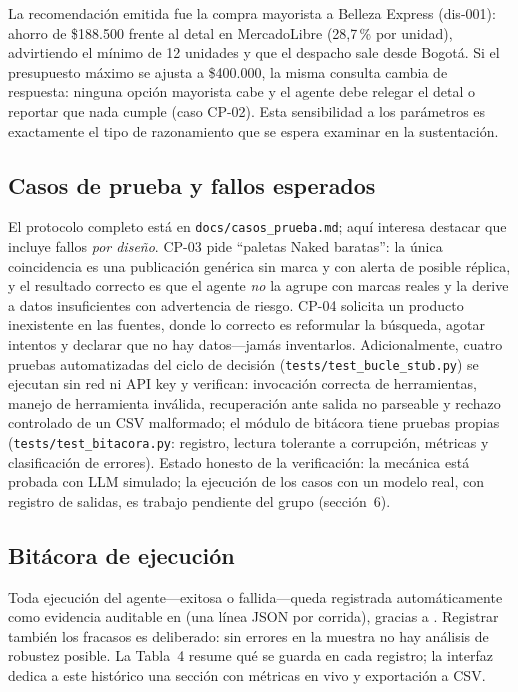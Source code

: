\documentclass[11pt,letterpaper]{article}
\begin{document}
La recomendación emitida fue la compra mayorista a Belleza Express (dis-001): ahorro de \$188.500
frente al detal en MercadoLibre (28,7\,\% por unidad), advirtiendo el mínimo de 12 unidades y que el
despacho sale desde Bogotá. Si el presupuesto máximo se ajusta a \$400.000, la misma consulta cambia
de respuesta: ninguna opción mayorista cabe y el agente debe relegar el detal o reportar que nada
cumple (caso CP-02). Esta sensibilidad a los parámetros es exactamente el tipo de razonamiento que se
espera examinar en la sustentación.

\subsection*{Casos de prueba y fallos esperados}

El protocolo completo está en \texttt{docs/casos\_prueba.md}; aquí interesa destacar que incluye
fallos \emph{por diseño}. CP-03 pide ``paletas Naked baratas'': la única coincidencia es una
publicación genérica sin marca y con alerta de posible réplica, y el resultado correcto es que el
agente \emph{no} la agrupe con marcas reales y la derive a datos insuficientes con advertencia de
riesgo. CP-04 solicita un producto inexistente en las fuentes, donde lo correcto es reformular la
búsqueda, agotar intentos y declarar que no hay datos---jamás inventarlos. Adicionalmente, cuatro
pruebas automatizadas del ciclo de decisión (\texttt{tests/test\_bucle\_stub.py}) se ejecutan sin red
ni API key y verifican: invocación correcta de herramientas, manejo de herramienta inválida,
recuperación ante salida no parseable y rechazo controlado de un CSV malformado; el módulo de
bitácora tiene pruebas propias (\texttt{tests/test\_bitacora.py}: registro, lectura tolerante a
corrupción, métricas y clasificación de errores). Estado honesto de la
verificación: la mecánica está probada con LLM simulado; la ejecución de los casos con un modelo real,
con registro de salidas, es trabajo pendiente del grupo (sección~6).

\subsection*{Bitácora de ejecución}

Toda ejecución del agente---exitosa o fallida---queda registrada automáticamente como evidencia
auditable en  (una línea JSON por corrida), gracias a
. Registrar también los fracasos es deliberado: sin errores en la muestra no
hay análisis de robustez posible. La Tabla~4 resume qué se guarda en cada registro; la interfaz
dedica a este histórico una sección con métricas en vivo y exportación a CSV.
\end{document}
